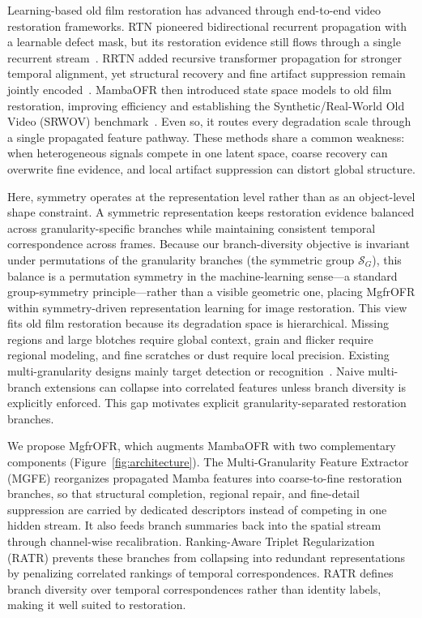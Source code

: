 Learning-based old film restoration has advanced through end-to-end video restoration frameworks. RTN pioneered bidirectional recurrent propagation with a learnable defect mask, but its restoration evidence still flows through a single recurrent stream~\cite{wan2022rtn}. RRTN added recursive transformer propagation for stronger temporal alignment, yet structural recovery and fine artifact suppression remain jointly encoded~\cite{lin2024rrtn}. MambaOFR then introduced state space models to old film restoration, improving efficiency and establishing the Synthetic/Real-World Old Video (SRWOV) benchmark~\cite{mao2025mambaofr,gu2024mamba,guo2024mambair}. Even so, it routes every degradation scale through a single propagated feature pathway. These methods share a common weakness: when heterogeneous signals compete in one latent space, coarse recovery can overwrite fine evidence, and local artifact suppression can distort global structure.

Here, symmetry operates at the representation level rather than as an object-level shape constraint. A symmetric representation keeps restoration evidence balanced across granularity-specific branches while maintaining consistent temporal correspondence across frames. Because our branch-diversity objective is invariant under permutations of the granularity branches (the symmetric group $\mathcal{S}_G$), this balance is a permutation symmetry in the machine-learning sense---a standard group-symmetry principle---rather than a visible geometric one, placing MgfrOFR within symmetry-driven representation learning for image restoration. This view fits old film restoration because its degradation space is hierarchical. Missing regions and large blotches require global context, grain and flicker require regional modeling, and fine scratches or dust require local precision. Existing multi-granularity designs mainly target detection or recognition~\cite{lin2017fpn,wang2021hrnet,sun2018pcb,wang2018mgn,gu2025reidmamba}. Naive multi-branch extensions can collapse into correlated features unless branch diversity is explicitly enforced. This gap motivates explicit granularity-separated restoration branches.

We propose MgfrOFR, which augments MambaOFR with two complementary components (Figure~\ref{fig:architecture}). The Multi-Granularity Feature Extractor (MGFE) reorganizes propagated Mamba features into coarse-to-fine restoration branches, so that structural completion, regional repair, and fine-detail suppression are carried by dedicated descriptors instead of competing in one hidden stream. It also feeds branch summaries back into the spatial stream through channel-wise recalibration. Ranking-Aware Triplet Regularization (RATR) prevents these branches from collapsing into redundant representations by penalizing correlated rankings of temporal correspondences. RATR defines branch diversity over temporal correspondences rather than identity labels, making it well suited to restoration.

